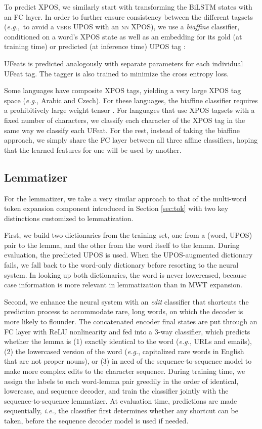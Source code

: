 \documentclass[11pt,a4paper]{article}
\begin{document}
To predict XPOS, we similarly start with transforming the BiLSTM states with an FC layer. In order to further ensure consistency between the different tagsets (\emph{e.g.},\ to avoid a \textsc{verb} UPOS with an \textsc{nn} XPOS), we use a \emph{biaffine} classifier, conditioned on a word's XPOS state as well as an embedding for its gold (at training time) or predicted (at inference time) UPOS tag :

UFeats is predicted analogously with separate parameters for each individual UFeat tag. The tagger is also trained to minimize the cross entropy loss.

Some languages have composite XPOS tags, yielding a very large XPOS tag space
(\emph{e.g.}, Arabic and Czech).
For these languages, the biaffine classifier requires a prohibitively large weight tensor .
For languages that use XPOS tagsets with a fixed number of characters, we classify each character of the XPOS tag in the same way we classify each UFeat.
For the rest, instead of taking the biaffine approach, we simply share the FC layer between all three affine classifiers, hoping that the learned features for one will be used by another.

\subsection{Lemmatizer}

For the lemmatizer, we take a very similar approach to that of the multi-word token expansion component introduced in Section \ref{sec:tok} with two key distinctions customized to lemmatization.

First, we build two dictionaries from the training set, one from a (word, UPOS) pair to the lemma, and the other from the word itself to the lemma.
During evaluation, the predicted UPOS is used.
When the UPOS-augmented dictionary fails, we fall back to the word-only dictionary before resorting to the neural system.
In looking up both dictionaries, the word is never lowercased, because case information is more relevant in lemmatization than in MWT expansion.

Second, we enhance the neural system with an \textit{edit} classifier that shortcuts the prediction process to accommodate rare, long words, on which the decoder is more likely to flounder.
The concatenated encoder final states are put through an FC layer with ReLU nonlinearity and fed into a 3-way classifier, which predicts whether the lemma is (1) exactly identical to the word (\emph{e.g.}, URLs and emails), (2) the lowercased version of the word (\emph{e.g.}, capitalized rare words in English that are not proper nouns), or (3) in need of the sequence-to-sequence model to make more complex edits to the character sequence.
During training time, we assign the labels to each word-lemma pair greedily in the order of identical, lowercase, and sequence decoder, and train the classifier jointly with the sequence-to-sequence lemmatizer.
At evaluation time, predictions are made sequentially, \emph{i.e.}, the classifier first determines whether any shortcut can be taken, before the sequence decoder model is used if needed.
\end{document}
